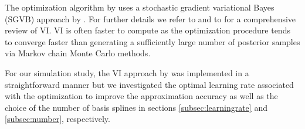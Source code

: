 \documentclass[%
 reprint,
 amsmath,amssymb,
 aps,
]{revtex4-2}
\begin{document}
The optimization algorithm by \cite{Hu2023} uses a stochastic gradient variational Bayes (SGVB) approach by \cite{kingma2022,Xu2019,Domke2019}. For further details we refer to \cite{Hu2023} and to \cite{Blei2017} for a comprehensive review of VI.
VI is often faster to compute as the optimization procedure tends to converge faster than generating a sufficiently large number of posterior samples via  Markov chain Monte Carlo methods.





For our simulation study, the VI approach by \cite{Hu2023} was implemented in a straightforward manner but we investigated the optimal learning rate associated with the optimization to improve the approximation accuracy as well as the choice of the number of basis splines in sections \ref{subsec:learningrate} and \ref{subsec:number}, respectively.

\medskip
\end{document}

